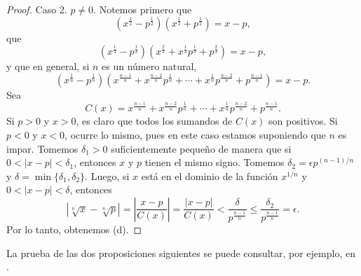 \documentclass[12pt,a4paper]{book}
\begin{document}
\begin{proof}
        Caso 2. $p\neq 0$. Notemos primero que
        \begin{equation*}
            \left(x^{\frac{1}{2}}-p^{\frac{1}{2}}\right)\left(x^{\frac{1}{2}}+p^{\frac{1}{2}}\right)=x-p,
        \end{equation*}
        que
        \begin{equation*}
            \left(x^{\frac{1}{3}}-p^{\frac{1}{3}}\right)\left(x^{\frac{2}{3}}+x^{\frac{1}{3}}p^{\frac{1}{3}}+p^{\frac{2}{3}}\right)=x-p,
        \end{equation*}
        y que en general, si $n$ es un número natural,
        \begin{equation*}
            \left(x^{\frac{1}{n}}-p^{\frac{1}{n}}\right)\left(x^{\frac{n-1}{n}}+x^{\frac{n-2}{n}}p^{\frac{1}{n}}+\cdots+x^{\frac{1}{n}}p^{\frac{n-2}{n}}+p^{\frac{n-1}{n}}\right)=x-p.
        \end{equation*}
        Sea
        \begin{equation*}
            C(x)=x^{\frac{n-1}{n}}+x^{\frac{n-2}{n}}p^{\frac{1}{n}}+\cdots+x^{\frac{1}{n}}p^{\frac{n-2}{n}}+p^{\frac{n-1}{n}}.
        \end{equation*}
        Si $p>0$ y $x>0$, es claro que todos los sumandos de $C(x)$ son positivos.
        Si $p<0$ y $x<0$, ocurre lo mismo, pues en este caso estamos suponiendo
        que $n$ es impar. Tomemos $\delta_{1}>0$ suficientemente pequeño de manera que
        si $0<|x-p|<\delta_{1}$, entonces $x$ y $p$ tienen el mismo signo. Tomemos $\delta_{2}=
        \epsilon p^{(n-1)/n}$ y $\delta=\min\{\delta_{1},\delta_{2}\}$. Luego, si $x$ está en el dominio de la función $x^{1/n}$
        y $0<|x-p|<\delta$, entonces
        \begin{equation*}
            \left|\sqrt[n]{x}-\sqrt[n]{p}\right|=\left|\frac{x-p}{C(x)}\right|=\frac{|x-p|}{C(x)}<\frac{\delta}{p^{\frac{n-1}{n}}}\leq\frac{\delta_{2}}{p^{\frac{n-1}{n}}}=\epsilon.
        \end{equation*}
        Por lo tanto, obtenemos (d).
    \end{proof}

    La prueba de las dos proposiciones siguientes se puede consultar, por ejemplo,
    en \cite{nunez2020calculoII}.
\end{document}
